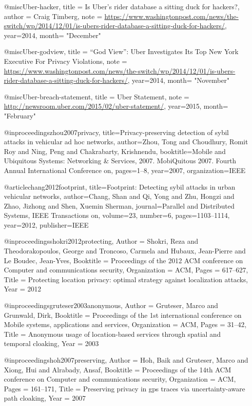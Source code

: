 @misc{Uber-hacker,
title = {{Is Uber's rider database a sitting duck for hackers?}},
author = {Craig Timberg},
note = {\url{https://www.washingtonpost.com/news/the-switch/wp/2014/12/01/is-ubers-rider-database-a-sitting-duck-for-hackers/}},
year=2014,
month= "December"
}

@misc{Uber-godview,
title = {{``God View'': Uber Investigates Its Top New York Executive For Privacy Violations}},
note = {\url{https://www.washingtonpost.com/news/the-switch/wp/2014/12/01/is-ubers-rider-database-a-sitting-duck-for-hackers/}},
year=2014,
month= "November"
}


@misc{Uber-breach-statement,
title = {{Uber Statement}},
note = {\url{http://newsroom.uber.com/2015/02/uber-statement/}},
year=2015,
month= "February"
}



@inproceedings{zhou2007privacy,
  title={Privacy-preserving detection of sybil attacks in vehicular ad hoc networks},
  author={Zhou, Tong and Choudhury, Romit Roy and Ning, Peng and Chakrabarty, Krishnendu},
  booktitle={Mobile and Ubiquitous Systems: Networking \& Services, 2007. MobiQuitous 2007. Fourth Annual International Conference on},
  pages={1--8},
  year={2007},
  organization={IEEE}
}

@article{chang2012footprint,
  title={Footprint: Detecting sybil attacks in urban vehicular networks},
  author={Chang, Shan and Qi, Yong and Zhu, Hongzi and Zhao, Jizhong and Shen, Xuemin Sherman},
  journal={Parallel and Distributed Systems, IEEE Transactions on},
  volume={23},
  number={6},
  pages={1103--1114},
  year={2012},
  publisher={IEEE}
}

@inproceedings{shokri2012protecting,
	Author = {Shokri, Reza and Theodorakopoulos, George and Troncoso, Carmela and Hubaux, Jean-Pierre and Le Boudec, Jean-Yves},
	Booktitle = {Proceedings of the 2012 ACM conference on Computer and communications security},
	Organization = {ACM},
	Pages = {617--627},
	Title = {Protecting location privacy: optimal strategy against localization attacks},
	Year = {2012}}


@inproceedings{gruteser2003anonymous,
	Author = {Gruteser, Marco and Grunwald, Dirk},
	Booktitle = {Proceedings of the 1st international conference on Mobile systems, applications and services},
	Organization = {ACM},
	Pages = {31--42},
	Title = {Anonymous usage of location-based services through spatial and temporal cloaking},
	Year = {2003}}



@inproceedings{hoh2007preserving,
	Author = {Hoh, Baik and Gruteser, Marco and Xiong, Hui and Alrabady, Ansaf},
	Booktitle = {Proceedings of the 14th ACM conference on Computer and communications security},
	Organization = {ACM},
	Pages = {161--171},
	Title = {Preserving privacy in gps traces via uncertainty-aware path cloaking},
	Year = {2007}}


